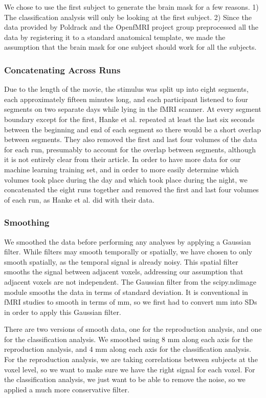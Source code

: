 \documentclass[11pt]{article}
\begin{document}
We chose to use the first subject to generate the brain mask for a few 
reasons.  1) The classification analysis will only be looking at the first
subject.  2) Since the data provided by Poldrack and the OpenfMRI project 
group preprocessed all the data by registering it to a standard anatomical 
template, we made the assumption that the brain mask for one subject 
should work for all the subjects.

\subsubsection{Concatenating Across Runs}
Due to the length of the movie, the stimulus was split up into eight segments,  
each approximately fifteen minutes long, and each participant listened to four  
segments on two separate days while lying in the fMRI scanner.  At every        
segment boundary except for the first, Hanke et al. repeated at least the last 
six seconds between the beginning and end of each segment so there would be a 
short overlap between segments.  They also removed the first and last four 
volumes of the data for each run, presumably to account for the overlap 
between segments, although it is not entirely clear from their article.  In 
order to have more data for our machine learning training set, and in order to 
more easily determine which volumes took place during the day and which took 
place during the night, we concatenated the eight runs together and removed the
first and last four volumes of each run, as Hanke et al. did with their data.

\subsubsection{Smoothing}

We smoothed the data before performing any analyses by applying a Gaussian      
filter.  While filters may smooth temporally or spatially, we have chosen to    
only smooth spatially, as the temporal signal is already noisy.  This spatial  
filter smooths the signal between adjacent voxels, addressing                   
our assumption that adjacent voxels are not independent.  The   
Gaussian filter from the scipy.ndimage module smooths the data in terms of      
standard deviation.  It is conventional in fMRI studies to smooth in terms of mm, 
so we first had to convert mm into SDs in order to apply this  
Gaussian filter.

There are two versions of smooth data, one for the reproduction analysis, and
one for the classification analysis.  We smoothed using 8 mm along each axis
for the reproduction analysis, and 4 mm along each axis for the classification
analysis.  For the reproduction analysis, we are taking correlations between
subjects at the voxel level, so we want to make sure we have the right signal for each voxel.  For the classification analysis, we just want to be able to remove the noise, so we 
applied a much more conservative filter.
\end{document}
